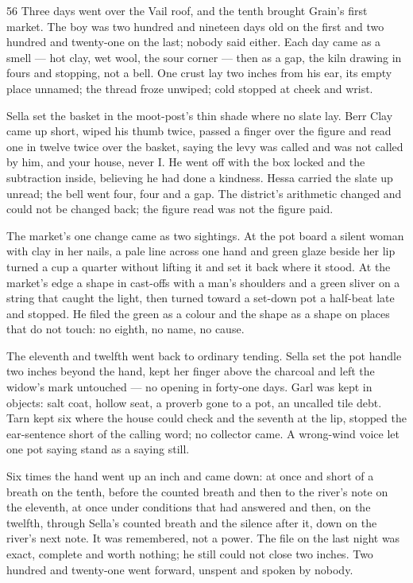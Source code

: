 \begin{CRchronicle}{56}
Three days went over the Vail roof, and the tenth brought Grain’s first market. The boy was two hundred and nineteen days old on the first and two hundred and twenty-one on the last; nobody said either. Each day came as a smell --- hot clay, wet wool, the sour corner --- then as a gap, the kiln drawing in fours and stopping, not a bell. One crust lay two inches from his ear, its empty place unnamed; the thread froze unwiped; cold stopped at cheek and wrist.

Sella set the basket in the moot-post’s thin shade where no slate lay. Berr Clay came up short, wiped his thumb twice, passed a finger over the figure and read one in twelve twice over the basket, saying the levy was called and was not called by him, and your house, never I. He went off with the box locked and the subtraction inside, believing he had done a kindness. Hessa carried the slate up unread; the bell went four, four and a gap. The district’s arithmetic changed and could not be changed back; the figure read was not the figure paid.

The market’s one change came as two sightings. At the pot board a silent woman with clay in her nails, a pale line across one hand and green glaze beside her lip turned a cup a quarter without lifting it and set it back where it stood. At the market’s edge a shape in cast-offs with a man’s shoulders and a green sliver on a string that caught the light, then turned toward a set-down pot a half-beat late and stopped. He filed the green as a colour and the shape as a shape on places that do not touch: no eighth, no name, no cause.

The eleventh and twelfth went back to ordinary tending. Sella set the pot handle two inches beyond the hand, kept her finger above the charcoal and left the widow’s mark untouched --- no opening in forty-one days. Garl was kept in objects: salt coat, hollow seat, a proverb gone to a pot, an uncalled tile debt. Tarn kept six where the house could check and the seventh at the lip, stopped the ear-sentence short of the calling word; no collector came. A wrong-wind voice let one pot saying stand as a saying still.

Six times the hand went up an inch and came down: at once and short of a breath on the tenth, before the counted breath and then to the river’s note on the eleventh, at once under conditions that had answered and then, on the twelfth, through Sella’s counted breath and the silence after it, down on the river’s next note. It was remembered, not a power. The file on the last night was exact, complete and worth nothing; he still could not close two inches. Two hundred and twenty-one went forward, unspent and spoken by nobody.
\end{CRchronicle}
